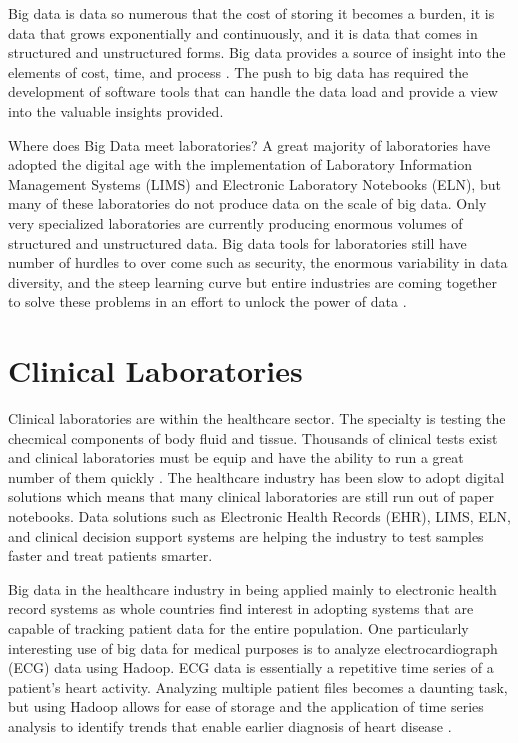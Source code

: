 \documentclass[sigconf]{acmart}
\begin{document}
Big data is data so numerous that the cost of storing it becomes a burden, it is data that grows exponentially and continuously, and it is data that comes in structured and unstructured forms. Big data provides a source of insight into the elements of cost, time, and process \cite{www-sasbig}. The push to big data has required the development of software tools that can handle the data load and provide a view into the valuable insights provided. 

Where does Big Data meet laboratories? A great majority of laboratories have adopted the digital age with the implementation of Laboratory Information Management Systems (LIMS) and Electronic Laboratory Notebooks (ELN), but many of these laboratories do not produce data on the scale of big data. Only very specialized laboratories are currently producing enormous volumes of structured and unstructured data. Big data tools for laboratories still have  number of hurdles to over come such as security, the enormous variability in data diversity, and the steep learning curve but entire industries are coming together to solve these problems in an effort to unlock the power of data \cite{Ardagna}.


\section{Clinical Laboratories}
Clinical laboratories are within the healthcare sector. The specialty is testing the checmical components of body fluid and tissue. Thousands of clinical tests exist and clinical laboratories must be equip and have the ability to run a great number of them quickly \cite{www-stanford}. The healthcare industry has been slow to adopt digital solutions which means that many clinical laboratories are still run out of paper notebooks. Data solutions such as Electronic Health Records (EHR), LIMS, ELN, and clinical decision support systems are helping the industry to test samples faster and treat patients smarter. 

Big data in the healthcare industry in being applied mainly to electronic health record systems as whole countries find interest in adopting systems that are capable of tracking patient data for the entire population. One particularly interesting use of big data for medical purposes is to analyze electrocardiograph (ECG) data using Hadoop. ECG data is essentially a repetitive time series of a patient's heart activity. Analyzing multiple patient files becomes a daunting task, but using Hadoop allows for ease of storage and the application of time series analysis to identify trends that enable earlier diagnosis of heart disease \cite{Sivaranjani}.
\end{document}
